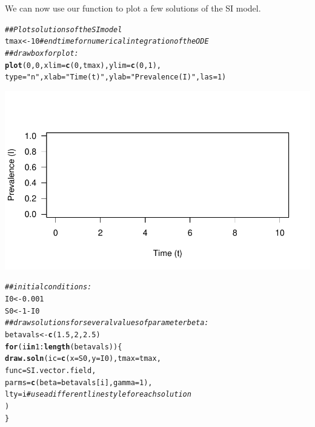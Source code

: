 \documentclass[12pt]{article}\usepackage[]{graphicx}\usepackage[]{color}
\makeatletter
\def\maxwidth{ %
  \ifdim\Gin@nat@width>\linewidth
    \linewidth
  \else
    \Gin@nat@width
  \fi
}
\newcommand{\hlnum}[1]{\textcolor[rgb]{0.686,0.059,0.569}{#1}}%
\newcommand{\hlstr}[1]{\textcolor[rgb]{0.192,0.494,0.8}{#1}}%
\newcommand{\hlcom}[1]{\textcolor[rgb]{0.678,0.584,0.686}{\textit{#1}}}%
\newcommand{\hlopt}[1]{\textcolor[rgb]{0,0,0}{#1}}%
\newcommand{\hlstd}[1]{\textcolor[rgb]{0.345,0.345,0.345}{#1}}%
\newcommand{\hlkwa}[1]{\textcolor[rgb]{0.161,0.373,0.58}{\textbf{#1}}}%
\newcommand{\hlkwb}[1]{\textcolor[rgb]{0.69,0.353,0.396}{#1}}%
\newcommand{\hlkwc}[1]{\textcolor[rgb]{0.333,0.667,0.333}{#1}}%
\newcommand{\hlkwd}[1]{\textcolor[rgb]{0.737,0.353,0.396}{\textbf{#1}}}%
\newenvironment{kframe}{%
 \def\at@end@of@kframe{}%
 \ifinner\ifhmode%
  \def\at@end@of@kframe{\end{minipage}}%
  \begin{minipage}{\columnwidth}%
 \fi\fi%
 \def\FrameCommand##1{\hskip\@totalleftmargin \hskip-\fboxsep
 \colorbox{shadecolor}{##1}\hskip-\fboxsep
     \hskip-\linewidth \hskip-\@totalleftmargin \hskip\columnwidth}%
 \MakeFramed {\advance\hsize-\width
   \@totalleftmargin\z@ \linewidth\hsize
   \@setminipage}}%
 {\par\unskip\endMakeFramed%
 \at@end@of@kframe}
\newenvironment{knitrout}{}{} %
\makeatother
\begin{document}
\begin{enumerate}[(a)]
\begin{itemize}
We can now use our  function to plot a few solutions of the SI model.

\begin{knitrout}
\color{fgcolor}\begin{kframe}
\begin{alltt}
\hlcom{## Plot solutions of the SI model}
\hlstd{tmax} \hlkwb{<-} \hlnum{10} \hlcom{# end time for numerical integration of the ODE}
\hlcom{## draw box for plot:}
\hlkwd{plot}\hlstd{(}\hlnum{0}\hlstd{,}\hlnum{0}\hlstd{,}\hlkwc{xlim}\hlstd{=}\hlkwd{c}\hlstd{(}\hlnum{0}\hlstd{,tmax),}\hlkwc{ylim}\hlstd{=}\hlkwd{c}\hlstd{(}\hlnum{0}\hlstd{,}\hlnum{1}\hlstd{),}
     \hlkwc{type}\hlstd{=}\hlstr{"n"}\hlstd{,}\hlkwc{xlab}\hlstd{=}\hlstr{"Time (t)"}\hlstd{,}\hlkwc{ylab}\hlstd{=}\hlstr{"Prevalence (I)"}\hlstd{,}\hlkwc{las}\hlstd{=}\hlnum{1}\hlstd{)}
\end{alltt}
\end{kframe}
\includegraphics[width=\maxwidth]{figure/plot_SI_model-1} 
\begin{kframe}\begin{alltt}
\hlcom{## initial conditions:}
\hlstd{I0} \hlkwb{<-} \hlnum{0.001}
\hlstd{S0} \hlkwb{<-} \hlnum{1} \hlopt{-} \hlstd{I0}
\hlcom{## draw solutions for several values of parameter beta:}
\hlstd{betavals} \hlkwb{<-} \hlkwd{c}\hlstd{(}\hlnum{1.5}\hlstd{,}\hlnum{2}\hlstd{,}\hlnum{2.5}\hlstd{)}
\hlkwa{for} \hlstd{(i} \hlkwa{in} \hlnum{1}\hlopt{:}\hlkwd{length}\hlstd{(betavals)) \{}
  \hlkwd{draw.soln}\hlstd{(}\hlkwc{ic}\hlstd{=}\hlkwd{c}\hlstd{(}\hlkwc{x}\hlstd{=S0,}\hlkwc{y}\hlstd{=I0),} \hlkwc{tmax}\hlstd{=tmax,}
            \hlkwc{func}\hlstd{=SI.vector.field,}
            \hlkwc{parms}\hlstd{=}\hlkwd{c}\hlstd{(}\hlkwc{beta}\hlstd{=betavals[i],}\hlkwc{gamma}\hlstd{=}\hlnum{1}\hlstd{),}
            \hlkwc{lty}\hlstd{=i} \hlcom{# use a different line style for each solution}
            \hlstd{)}
\hlstd{\}}
\end{alltt}



\end{kframe}
\end{knitrout}
\end{itemize}
\end{enumerate}
\end{document}
